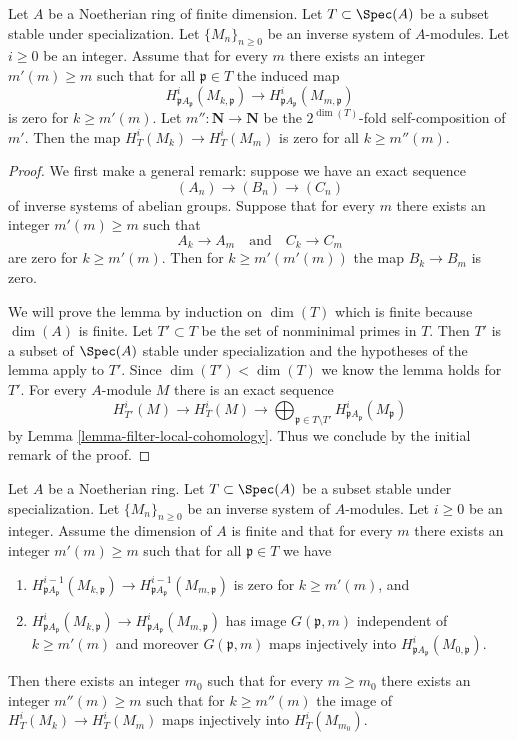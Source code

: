 \begin{lemma}
\label{lemma-zero}
Let $A$ be a Noetherian ring of finite dimension.
Let $T \subset \Spec(A)$ be a subset stable under specialization.
Let $\{M_n\}_{n \geq 0}$ be an inverse system of $A$-modules.
Let $i \geq 0$ be an integer. Assume that for every $m$ there
exists an integer $m'(m) \geq m$ such  that for all
$\mathfrak p \in T$ the induced map
$$
H^i_{\mathfrak p A_\mathfrak p}(M_{k, \mathfrak p})
\longrightarrow
H^i_{\mathfrak p A_\mathfrak p}(M_{m, \mathfrak p})
$$
is zero for $k \geq m'(m)$. Let $m'' : \mathbf{N} \to \mathbf{N}$
be the $2^{\dim(T)}$-fold self-composition of $m'$. Then the map
$H^i_T(M_k) \to H^i_T(M_m)$ is zero for all $k \geq m''(m)$.
\end{lemma}

\begin{proof}
We first make a general remark: suppose we have an exact
sequence
$$
(A_n) \to (B_n) \to (C_n)
$$
of inverse systems of abelian groups. Suppose that for every
$m$ there exists an integer $m'(m) \geq m$ such that
$$
A_k \to A_m
\quad\text{and}\quad
C_k \to C_m
$$
are zero for $k \geq m'(m)$. Then for $k \geq m'(m'(m))$
the map $B_k \to B_m$ is zero.

\medskip\noindent
We will prove the lemma by induction on $\dim(T)$ which is
finite because $\dim(A)$ is finite. Let $T' \subset T$ be
the set of nonminimal primes in $T$. Then $T'$
is a subset of $\Spec(A)$ stable under specialization
and the hypotheses of the lemma apply to $T'$.
Since $\dim(T') < \dim(T)$ we know the lemma holds for $T'$.
For every $A$-module $M$ there is an exact sequence
$$
H^i_{T'}(M) \to H^i_T(M) \to
\bigoplus\nolimits_{\mathfrak p \in T \setminus T'}
H^i_{\mathfrak p A_\mathfrak p}(M_\mathfrak p)
$$
by Lemma \ref{lemma-filter-local-cohomology}.
Thus we conclude by the initial remark of the proof.
\end{proof}

\begin{lemma}
\label{lemma-essential-image}
Let $A$ be a Noetherian ring. Let $T \subset \Spec(A)$ be a subset
stable under specialization. Let $\{M_n\}_{n \geq 0}$ be an inverse system
of $A$-modules. Let $i \geq 0$ be an integer. Assume the dimension of $A$
is finite and that for every $m$ there exists an integer $m'(m) \geq m$
such that for all $\mathfrak p \in T$ we have
\begin{enumerate}
\item $H^{i - 1}_{\mathfrak p A_\mathfrak p}(M_{k, \mathfrak p})
\to H^{i - 1}_{\mathfrak p A_\mathfrak p}(M_{m, \mathfrak p})$
is zero for $k \geq m'(m)$, and
\item $ H^i_{\mathfrak p A_\mathfrak p}(M_{k, \mathfrak p}) \to
H^i_{\mathfrak p A_\mathfrak p}(M_{m, \mathfrak p})$
has image $G(\mathfrak p, m)$ independent of $k \geq m'(m)$ and moreover
$G(\mathfrak p, m)$ maps injectively into
$H^i_{\mathfrak p A_\mathfrak p}(M_{0, \mathfrak p})$.
\end{enumerate}
Then there exists an integer $m_0$ such that for every $m \geq m_0$
there exists an integer $m''(m) \geq m$ such that
for $k \geq m''(m)$ the image of $H^i_T(M_k) \to H^i_T(M_m)$
maps injectively into $H^i_T(M_{m_0})$.
\end{lemma}

